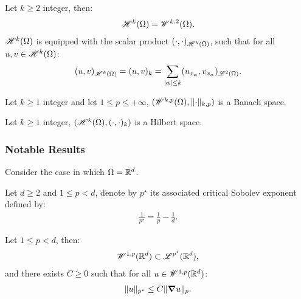 \begin{definition}[$\Hk{k}(\Omega)$]
    Let $k \geq 2$ integer, then:
    \begin{gather}
        \mathscr{H}^{k}(\Omega) = \mathscr{W}^{k, 2}(\Omega).
    \end{gather}
    $\Hk{k}(\Omega)$ is equipped with the scalar product $(\cdot, \cdot)_{\mathscr{H}^{k}(\Omega)}$, such that for all $u, v \in \mathscr{H}^{k}(\Omega)$:
    \begin{gather}
        (u, v)_{\mathscr{H}^{k}(\Omega)} = (u, v)_k = \sum_{\lvert \alpha \rvert \leq k} (u_{x_{\alpha}}, v_{x_{\alpha}})_{\mathscr{L}^{2}(\Omega)}.
    \end{gather}
\end{definition}

\begin{remark}
    Let $k \geq 1$ integer and let $1 \leq p \leq +\infty$, $(\mathscr{W}^{k, p}(\Omega), \lVert \cdot \rVert_{k, p})$ is a Banach space.
\end{remark}

\begin{remark}
    Let $k \geq 1$ integer, $(\mathscr{H}^{k}(\Omega), (\cdot, \cdot)_k)$ is a Hilbert space.
\end{remark}

\subsubsection{Notable Results}

Consider the case in which $\Omega = \mathbb{R}^{d}$.

\begin{definition}
    Let $d \geq 2$ and $1 \leq p < d$, denote by $p^{\star}$ its associated critical Sobolev exponent defined by:
    \begin{gather}
        \frac{1}{p^{\star}} = \frac{1}{p} - \frac{1}{d}.
    \end{gather}
\end{definition}

\begin{theorem}
    Let $1 \leq p < d$, then:
    \begin{gather}
        \mathscr{W}^{1, p}(\mathbb{R}^{d}) \subset \mathscr{L}^{p^{\star}}(\mathbb{R}^{d}),
    \end{gather}
    and there exists $C \geq 0$ such that for all $u \in \mathscr{W}^{1, p}(\mathbb{R}^{d})$:
    \begin{gather}
        \lVert u \rVert_{p^{\star}} \leq C \lVert \bm{\nabla} u \rVert_p.
    \end{gather}
\end{theorem}

